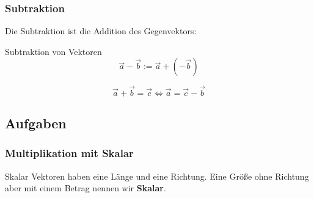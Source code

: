 \subsubsection{Subtraktion}
Die Subtraktion ist die Addition des Gegenvektors:

\begin{definition}{Subtraktion von Vektoren}{}
  $$\vec{a} - \vec{b} := \vec{a} + (-\vec{b})$$
\end{definition}

\begin{bemerkung}{}{}
  $$\vec{a} + \vec{b} = \vec{c} \Longleftrightarrow \vec{a} = \vec{c} - \vec{b}$$
  \end{bemerkung}

\subsection*{Aufgaben}
\newpage


\subsubsection{Multiplikation mit Skalar}
\begin{definition}{Skalar}{}
  Vektoren haben eine Länge und eine Richtung. Eine Größe ohne
  Richtung aber mit einem Betrag nennen wir \textbf{Skalar}. 
\end{definition}
\newpage
